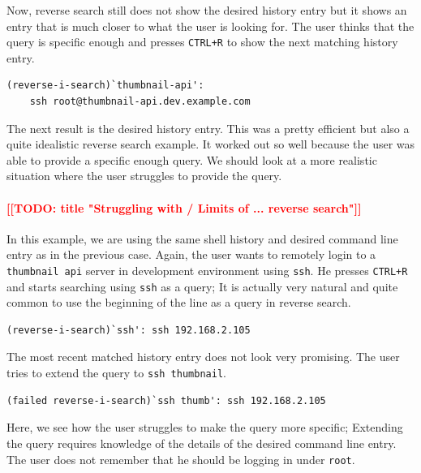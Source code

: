 \documentclass[thesis=M,english]{FITthesis}[2012/10/20]
\newcommand{\redtext}[1]{\textcolor{red}{[[#1]]}}
\begin{document}
Now, reverse search still does not show the desired history entry but it shows an entry that is much closer to what the user is looking for. The user thinks that the query is specific enough and presses \verb|CTRL+R| to show the next matching history entry.

\begin{verbatim}
(reverse-i-search)`thumbnail-api':
    ssh root@thumbnail-api.dev.example.com
\end{verbatim}

The next result is the desired history entry. This was a pretty efficient but also a quite idealistic reverse search example. It worked out so well because the user was able to provide a specific enough query. We should look at a more realistic situation where the user struggles to provide the query. %
\paragraph{\redtext{TODO: title "Struggling with / Limits of ... reverse search"}}

In this example, we are using the same shell history and desired command line entry as in the previous case. Again, the user wants to remotely login to a \verb|thumbnail api| server in development environment using \verb|ssh|. He presses \verb|CTRL+R| and starts searching using \verb|ssh| as a query; It is actually very natural and quite common to use the beginning of the line as a query in reverse search.

\begin{verbatim}
(reverse-i-search)`ssh': ssh 192.168.2.105
\end{verbatim}

The most recent matched history entry does not look very promising. The user tries to extend the query to \verb|ssh thumbnail|.

\begin{verbatim}
(failed reverse-i-search)`ssh thumb': ssh 192.168.2.105
\end{verbatim}

Here, we see how the user struggles to make the query more specific; Extending the query requires knowledge of the details of the desired command line entry. The user does not remember that he should be logging in under \verb|root|. %
\end{document}
